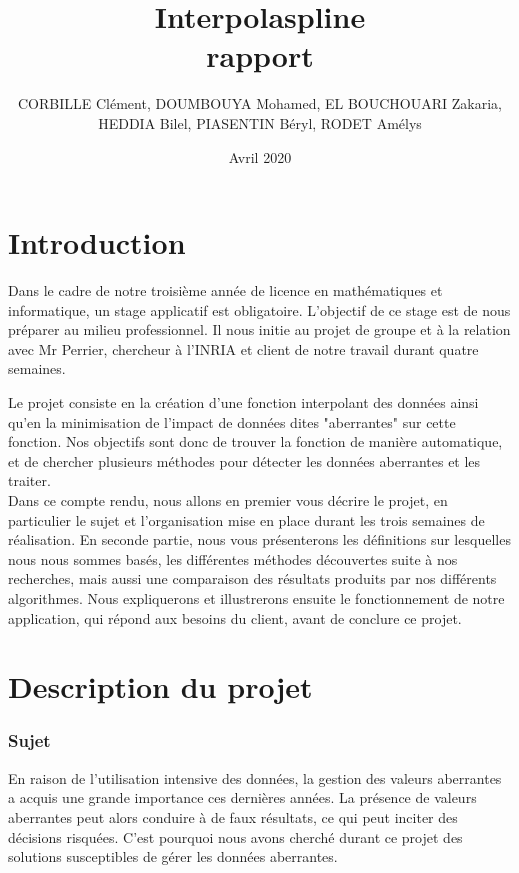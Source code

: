 \documentclass[a4paper,12pt]{article} %
\title{\textbf{Interpolaspline}\\ rapport}
\author{CORBILLE Clément, DOUMBOUYA Mohamed, EL BOUCHOUARI Zakaria, \\HEDDIA Bilel, PIASENTIN Béryl, RODET Amélys }
\date{Avril 2020}
\begin{document}
\maketitle

\newpage
\tableofcontents

\newpage

\renewcommand\partname{}
\part{Introduction}
    Dans le cadre de notre troisième année de licence en mathématiques et informatique, un stage applicatif est obligatoire. L'objectif de ce stage est de nous préparer au milieu professionnel. Il nous initie au projet de groupe et à la relation avec Mr Perrier, chercheur à l'INRIA et client de notre travail durant quatre semaines. 

    Le projet consiste en la création d'une fonction interpolant des données ainsi qu'en la minimisation de l'impact de données dites "aberrantes" sur cette fonction. Nos objectifs sont donc de trouver la fonction de manière automatique, et de chercher plusieurs méthodes pour détecter les données aberrantes et les traiter.\\

    Dans ce compte rendu, nous allons en premier vous décrire le projet, en particulier le sujet et l'organisation mise en place durant les trois semaines de réalisation. En seconde partie, nous vous présenterons les définitions sur lesquelles nous nous sommes basés, les différentes méthodes découvertes suite à nos recherches, mais aussi une comparaison des résultats produits par nos différents algorithmes. Nous expliquerons et illustrerons ensuite le fonctionnement de notre application, qui répond aux besoins du client, avant de conclure ce projet.

\renewcommand\partname{}
\part{Description du projet}
	\section{Sujet}
	    En raison de l'utilisation intensive des données, la gestion des valeurs aberrantes a acquis une grande importance ces dernières années. La présence de valeurs aberrantes peut alors conduire à de faux résultats, ce qui peut inciter des décisions risquées.
		C'est pourquoi nous avons cherché durant ce projet des solutions susceptibles de gérer les données aberrantes.\\
		
\end{document}

